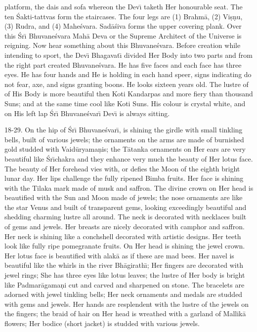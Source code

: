 platform, the dais and sofa whereon the Dev\={\i} taketh Her honourable seat. The ten \'Sakti-tattvas form the staircases. The four legs are (1) Brahm\=a, (2) Vi\d{s}\d{n}u, (3) Rudra, and (4) Mahe\'svara. Sad\=a\'siva forms the upper covering plank. Over this \'Sr\={\i} Bhuvane\'svara Mah\=a Deva or the Supreme Architect of the Universe is reigning. Now hear something about this Bhuvane\'svara. Before creation while intending to sport, the Dev\={\i} Bhagavat\={\i} divided Her Body into two parts and from the right part created Bhuvane\'svara. He has five faces and each face has three eyes. He has four hands and He is holding in each hand speer, signs indicating do not fear, axe, and signs granting boons. He looks sixteen years old. The lustre of of His Body is more beautiful then Koti Kandarpas and more fiery than thousand Suns; and at the same time cool like Koti Suns. His colour is crystal white, and on His left lap \'Sr\={\i} Bhuvane\'svar\={\i} Dev\={\i} is always sitting.

18-29. On the hip of \'Sr\={\i} Bhuvane\'svar\={\i}, is shining the girdle with small tinkling bells, built of various jewels; the ornaments on the arms are made of burnished gold studded with Vaid\=uryama\d{n}is; the T\=atanka ornaments on Her ears are very beautiful like \'Sr\={\i}chakra and they enhance very much the beauty of Her lotus face. The beauty of Her forehead vies with, or defies the Moon of the eighth bright lunar day. Her lips challenge the fully ripened Bimba fruits. Her face is shining with the Tilaka mark made of musk and saffron. The divine crown on Her head is beautified with the Sun and Moon made of jewels; the nose ornaments are like the star Venus and built of transparent gems, looking exceedingly beautiful and shedding charming lustre all around. The neck is decorated with necklaces built of gems and jewels. Her breasts are nicely decorated with camphor and saffron. Her neck is shining like a conchshell decorated with artistic designs. Her teeth look like fully ripe pomegranate fruits. On Her head is shining the jewel crown. Her lotus face is beautified with alak\=a as if these are mad bees. Her navel is beautiful like the whirls in the river Bh\=agirath\={\i}; Her fingers are decorated with jewel rings; She has three eyes like lotus leaves; the lustre of Her body is bright like Padmar\=agama\d{n}i cut and carved and sharpened on stone. The bracelets are adorned with jewel tinkling bells; Her neck ornaments and medals are studded with gems and jewels. Her hands are resplendent with the lustre of the jewels on the fingers; the braid of hair on Her head is wreathed with a garland of Mallik\=a flowers; Her bodice (short jacket) is studded with various jewels.

